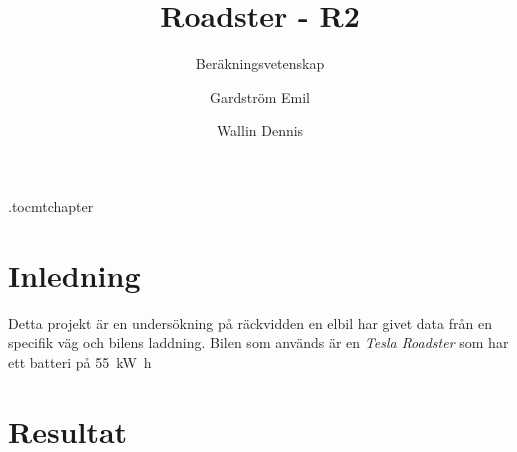 \documentclass[]{scrreprt}
\title{Roadster - R2}
\author{Gardström Emil \and Wallin Dennis}
\subtitle{Beräkningsvetenskap \RON{1}}
\begin{document}
\etocdepthtag.toc{mtchapter}
\maketitle
{}
%
\tableofcontents
\chapter{Inledning}
Detta projekt är en undersökning på räckvidden en elbil har givet data från en specifik väg och bilens laddning. Bilen som används är en \textit{Tesla Roadster} som har ett batteri på \SI{55}{\kilo\watt\hour}
\chapter{Resultat}
\end{document}
